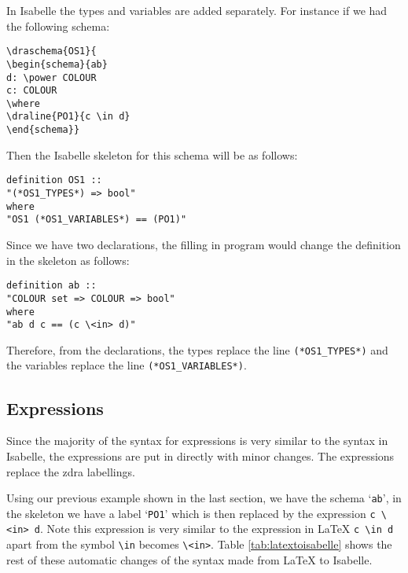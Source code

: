 In Isabelle the types and variables are added separately. For instance if we had
the following schema:

\begin{verbatim}
\draschema{OS1}{
\begin{schema}{ab}
d: \power COLOUR
c: COLOUR
\where
\draline{PO1}{c \in d}
\end{schema}}
\end{verbatim}

Then the Isabelle skeleton for this schema will be as follows:

\begin{verbatim}
definition OS1 ::
"(*OS1_TYPES*) => bool"
where
"OS1 (*OS1_VARIABLES*) == (PO1)"
\end{verbatim}

Since we have two declarations, the filling in program would change the
definition in the skeleton as follows:

\begin{verbatim}
definition ab ::
"COLOUR set => COLOUR => bool"
where
"ab d c == (c \<in> d)"
\end{verbatim}

Therefore, from the declarations, the types replace the line
\verb|(*OS1_TYPES*)| and the variables replace the line
\verb|(*OS1_VARIABLES*)|.

\subsection{Expressions}

Since the majority of the syntax for expressions is very similar to the syntax
in Isabelle, the expressions are put in directly with minor changes. The
expressions replace the \gls{zdra} labellings.

Using our previous example shown in the last section, we have the schema
`\texttt{ab}', in the skeleton we have a label `\texttt{PO1}' which is then
replaced by the expression \verb|c \<in> d|. Note this expression is very
similar to the expression in \LaTeX{} \verb|c \in d| apart from the symbol
\verb|\in| becomes \verb|\<in>|. Table \ref{tab:latextoisabelle} shows the rest
of these automatic changes of the syntax made from \LaTeX{} to Isabelle.

